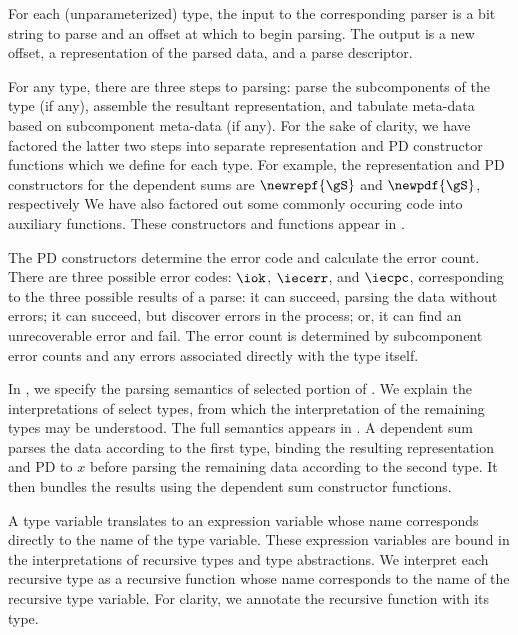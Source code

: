 For each (unparameterized) type, the input to the corresponding parser
is a bit string to parse and an offset at which to begin parsing.  
The output is a new offset,
a representation of the parsed data, and a parse descriptor.

For any type, there are three steps to parsing: parse the
subcomponents of the type (if any), assemble the resultant
representation, and tabulate meta-data based on subcomponent meta-data
(if any). For the sake of clarity, we have factored the latter two
steps into separate representation and PD constructor functions which
we define for each type. 
For example, the
representation and PD constructors for the dependent sums are
$\newrepf {\gS}$ and $\newpdf {\gS}$, 
respectively
We have also factored out some commonly
occuring code into auxiliary functions.  These constructors and functions
appear in .

The PD constructors determine the error code and calculate the error
count.  There are three possible error codes: $\iok$, $\iecerr$, and
$\iecpc$, corresponding to the three possible results of a parse: it
can succeed, parsing the data without errors; it can succeed, but
discover errors in the process; or, it can find an unrecoverable error
and fail.  The error count is determined by subcomponent error counts
and any errors associated directly with the type itself.

In , we specify the parsing semantics of
selected portion of \ddc{}. We explain the interpretations of select
types, from which the interpretation of the remaining types may be
understood. The full semantics appears in .
A dependent sum parses the data according to the first type, binding
the resulting representation and PD to $x$ before parsing the
remaining data according to the second type. It then bundles the
results using the dependent sum constructor functions.

A type variable translates to an expression variable whose name
corresponds directly to the name of the type variable. These
expression variables are bound in the interpretations of recursive
types and type abstractions. We interpret each recursive type as a
recursive function whose name corresponds to the name of the recursive
type variable. For clarity, we annotate the recursive function with its
type.

